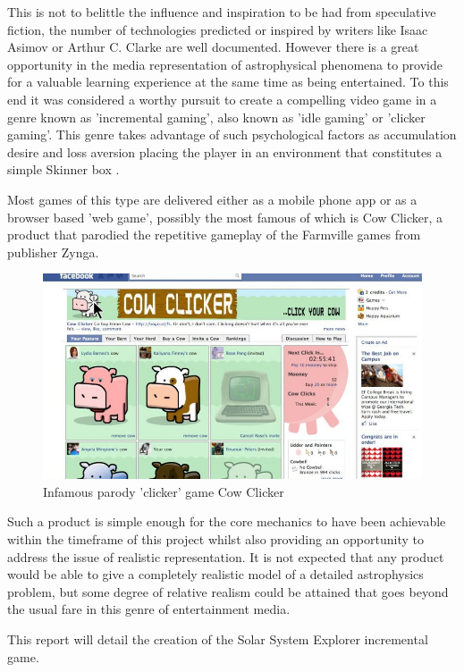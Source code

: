 \documentclass[twoside]{bhamthesis}
\begin{document}
This is not to belittle the influence and inspiration to be had from speculative fiction, the number of technologies predicted or inspired by writers like Isaac Asimov or Arthur C. Clarke are well documented. However there is a great opportunity in the media representation of astrophysical phenomena to provide for a valuable learning experience at the same time as being entertained. To this end it was considered a worthy pursuit to create a compelling video game in a genre known as 'incremental gaming', also known as 'idle gaming' or 'clicker gaming'. This genre takes advantage of such psychological factors  as accumulation desire and loss aversion placing the player in an environment that constitutes a simple Skinner box \cite{carlson_psychology:_2009}.

Most games of this type are delivered either as a mobile phone app or as a browser based 'web game', possibly the most famous of which is Cow Clicker, a product that parodied the repetitive gameplay of the Farmville games from publisher Zynga.

\begin{figure}[h!]
  \includegraphics[width=\linewidth]{images/cowclicker.jpg}
  \caption{Infamous parody 'clicker' game Cow Clicker {\cite{_games_2016}}}
  \label{fig:cowclicker}
\end{figure}

Such a product is simple enough for the core mechanics to have been achievable within the timeframe of this project whilst also providing an opportunity to address the issue of realistic representation. It is not expected that any product would be able to give a completely realistic model of a detailed astrophysics problem, but some degree of relative realism could be attained that goes beyond the usual fare in this genre of entertainment media.

\newpage
\noindent
This report will detail the creation of the Solar System Explorer incremental game.
\end{document}

